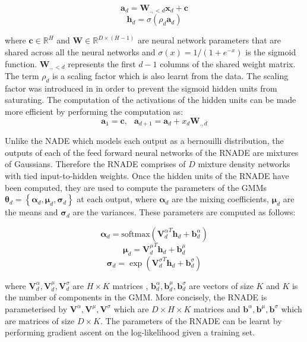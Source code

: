 \documentclass{article} %
\begin{document}
$$ \mathbf{a}_d = \boldsymbol{W}_{.,<d}\boldsymbol{x}_d + \mathbf{c}$$
$$ \boldsymbol{h}_d = \sigma (\rho_d \mathbf{a}_d)$$


where $\mathbf{c} \in \mathbb{R}^{H}$ and $\boldsymbol{W} \in \mathbb{R}^{D \times (H-1)}$ are neural network parameters that are shared across all the neural networks and $\sigma(x) = 1/(1+e^{-x})$ is the sigmoid function. $\boldsymbol{W}_{.,<d}$ represents the first $d-1$ columns of the shared weight matrix. The term $\rho_d$ is a scaling factor which is also learnt from the data. The scaling factor was introduced in \cite{AISTATS2011_Bengio11} in order to prevent the sigmoid hidden units from saturating. The computation of the activations of the hidden units can be made more efficient by performing the computation as:
$$ \mathbf{a}_1 = \mathbf{c}, \: \: \; \mathbf{a}_{d+1} = \mathbf{a}_{d} + x_d \mathbf{W}_{.,d}$$

 Unlike the NADE which models each output as a bernouilli distribution, the outputs of each of the feed forward neural networks of the RNADE are mixtures of Gaussians. Therefore the RNADE comprises of $D$ mixture density networks with tied input-to-hidden weights. Once the hidden units of the RNADE have been computed, they are used to compute the parameters of the GMMs $\boldsymbol{\theta}_d  = \left\{ \boldsymbol{\alpha}_d, \boldsymbol{\mu}_d, \boldsymbol{\sigma}_d \right\}$ at each output, where $\boldsymbol{\alpha}_d$ are the mixing coefficients, $\boldsymbol{\mu}_d$ are the means and $\boldsymbol{\sigma}_d$ are the variances. These parameters are computed as follows:

$$ \boldsymbol{\alpha}_d = \text{softmax} ({\mathbf{V}_{d}^{\alpha}}^T \mathbf{h}_d + \mathbf{b}^{\alpha}_{d})$$
$$ \boldsymbol{\mu}_d = {\mathbf{V}_{d}^{\mu}}^T \mathbf{h}_d + \mathbf{b}^{\mu}_{d}$$
$$ \boldsymbol{\sigma}_d = \exp ({\mathbf{V}_{d}^{\sigma}}^T \mathbf{h}_d + \mathbf{b}^{\sigma}_{d})$$

where $ \mathbf{V}_{d}^{\alpha},\mathbf{V}_{d}^{\mu},\mathbf{V}_{d}^{\sigma}$ are $H \times K$ matrices , $\mathbf{b}^{\alpha}_{d},\mathbf{b}^{\mu}_{d},\mathbf{b}^{\sigma}_{d}$ are vectors of size $K$ and $K$ is the number of components in the GMM. More concisely, the RNADE is parameterised by $\mathbf{V}^{\alpha},\mathbf{V}^{\mu},\mathbf{V}^{\sigma}$ which are $D \times H \times K$ matrices and $\mathbf{b}^{\alpha},\mathbf{b}^{\mu},\mathbf{b}^{\sigma}$ which are matrices of size $D \times K $.
The parameters of the RNADE can be learnt by performing gradient ascent on the log-likelihood given a training set. 
\end{document}
